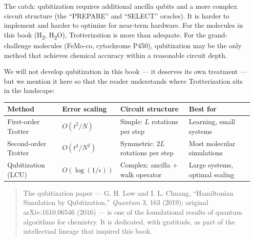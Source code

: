 \documentclass[
  11pt,
  oneside]{book}
\begin{document}
The catch: qubitization requires additional ancilla qubits and a more
complex circuit structure (the ``PREPARE'' and ``SELECT'' oracles). It
is harder to implement and harder to optimize for near-term hardware.
For the molecules in this book (H\textsubscript{2}, H\textsubscript{2}O), Trotterization is more than
adequate. For the grand-challenge molecules (FeMo-co, cytochrome P450),
qubitization may be the only method that achieves chemical accuracy
within a reasonable circuit depth.

We will not develop qubitization in this book --- it deserves its own
treatment --- but we mention it here so that the reader understands
where Trotterization sits in the landscape:

\begin{longtable}[]{@{}
  >{\raggedright\arraybackslash}p{}
  >{\raggedright\arraybackslash}p{}
  >{\raggedright\arraybackslash}p{}
  >{\raggedright\arraybackslash}p{}@{}}
\toprule\noalign{}
\begin{minipage}[b]{\linewidth}\raggedright
Method
\end{minipage} & \begin{minipage}[b]{\linewidth}\raggedright
Error scaling
\end{minipage} & \begin{minipage}[b]{\linewidth}\raggedright
Circuit structure
\end{minipage} & \begin{minipage}[b]{\linewidth}\raggedright
Best for
\end{minipage} \\
\midrule\noalign{}
\endhead
\bottomrule\noalign{}
\endlastfoot
First-order Trotter & \(O(t^2/N)\) & Simple: \(L\) rotations per step &
Learning, small systems \\
Second-order Trotter & \(O(t^3/N^2)\) & Symmetric: \(2L\) rotations per
step & Most molecular simulations \\
Qubitization (LCU) & \(O(\log(1/\epsilon))\) & Complex: ancilla + walk
operator & Large systems, optimal scaling \\
\end{longtable}

\begin{quote}
The qubitization paper --- G. H. Low and I. L. Chuang, ``Hamiltonian
Simulation by Qubitization,'' \emph{Quantum} 3, 163 (2019); original
arXiv:1610.06546 (2016) --- is one of the foundational results of
quantum algorithms for chemistry. It is dedicated, with gratitude, as
part of the intellectual lineage that inspired this book.
\end{quote}
\end{document}
